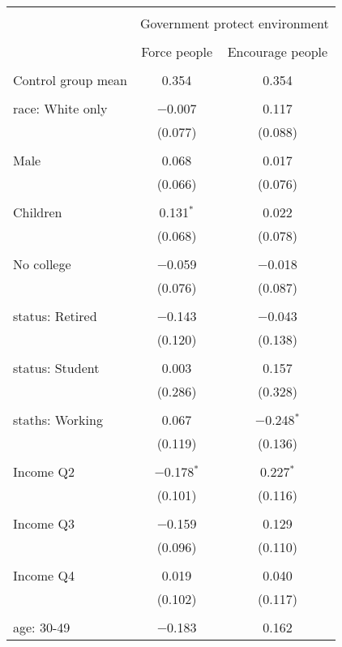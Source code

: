 
\begin{tabular}{@{\extracolsep{5pt}}lcc} 
\\[-1.8ex]\hline 
\hline \\[-1.8ex] 
 & \multicolumn{2}{c}{Government protect environment} \\ 
\cline{2-3} 
\\[-1.8ex] & Force people & Encourage people \\ 
\hline \\[-1.8ex] 
 Control group mean & 0.354 & 0.354  \\ \hline \\[-1.8ex] race: White only & $-$0.007 & 0.117 \\ 
  & (0.077) & (0.088) \\ 
  & & \\ 
 Male & 0.068 & 0.017 \\ 
  & (0.066) & (0.076) \\ 
  & & \\ 
 Children & 0.131$^{*}$ & 0.022 \\ 
  & (0.068) & (0.078) \\ 
  & & \\ 
 No college & $-$0.059 & $-$0.018 \\ 
  & (0.076) & (0.087) \\ 
  & & \\ 
 status: Retired & $-$0.143 & $-$0.043 \\ 
  & (0.120) & (0.138) \\ 
  & & \\ 
 status: Student & 0.003 & 0.157 \\ 
  & (0.286) & (0.328) \\ 
  & & \\ 
 staths: Working & 0.067 & $-$0.248$^{*}$ \\ 
  & (0.119) & (0.136) \\ 
  & & \\ 
 Income Q2 & $-$0.178$^{*}$ & 0.227$^{*}$ \\ 
  & (0.101) & (0.116) \\ 
  & & \\ 
 Income Q3 & $-$0.159 & 0.129 \\ 
  & (0.096) & (0.110) \\ 
  & & \\ 
 Income Q4 & 0.019 & 0.040 \\ 
  & (0.102) & (0.117) \\ 
  & & \\ 
 age: 30-49 & $-$0.183 & 0.162 \\ 

\end{tabular}
